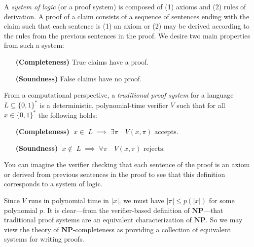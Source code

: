 \documentclass{article}
\newtheorem{definition}[theorem]{Definition}
\newcommand{\bits}{\{0,1\}}
\newcommand{\class}[1]{\mathbf{#1}}
\newcommand{\NP}{\class{NP}}
\begin{document}
A \emph{system of logic} (or a proof system) is composed of (1) axioms
and (2) rules of derivation.
A proof of a claim consists of a sequence of sentences ending with the claim
such that each sentence is (1) an axiom or (2) may be derived according to the rules
from the previous sentences in the proof.
We desire two main properties from such a system:
\begin{itemize}[leftmargin=10em]
\item[\textbf{(Completeness)}] True claims have a proof.
\item[\textbf{(Soundness)}] False claims have no proof.
\end{itemize}

%

From a computational perspective, a \emph{traditional proof system} for a
language $L \subseteq \bits^*$ is a deterministic, polynomial-time verifier $V$
such that for all $x \in \bits^*$ the following holds:
\begin{itemize}[leftmargin=10em]
\item[\textbf{(Completeness)}] $\;x \in\; L \;\implies\; \exists \pi \quad V(x, \pi) \text{ accepts}$.
\item[\textbf{(Soundness)}] $\;x \notin\; L \;\implies\; \forall \pi \quad V(x, \pi) \text{ rejects}$.
\end{itemize}
You can imagine the verifier checking that each sentence of the proof
is an axiom or derived from previous sentences in the proof to see that
this definition corresponds to a system of logic.

Since $V$ runs in polynomial time in $|x|$, we must have
$|\pi| \le p(|x|)$ for some polynomial $p$.
It is clear---from the verifier-based definition of $\NP$---that traditional proof
systems are an equivalent characterization of $\NP$.
So we may view the theory of $\NP$-completeness as providing a collection of
equivalent systems for writing proofs. 
\end{document}
